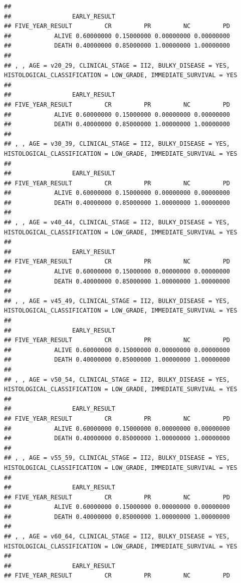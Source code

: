 \documentclass[]{article}
\begin{document}
\begin{verbatim}
## 
##                 EARLY_RESULT
## FIVE_YEAR_RESULT         CR         PR         NC         PD
##            ALIVE 0.60000000 0.15000000 0.00000000 0.00000000
##            DEATH 0.40000000 0.85000000 1.00000000 1.00000000
## 
## , , AGE = v20_29, CLINICAL_STAGE = II2, BULKY_DISEASE = YES, HISTOLOGICAL_CLASSIFICATION = LOW_GRADE, IMMEDIATE_SURVIVAL = YES
## 
##                 EARLY_RESULT
## FIVE_YEAR_RESULT         CR         PR         NC         PD
##            ALIVE 0.60000000 0.15000000 0.00000000 0.00000000
##            DEATH 0.40000000 0.85000000 1.00000000 1.00000000
## 
## , , AGE = v30_39, CLINICAL_STAGE = II2, BULKY_DISEASE = YES, HISTOLOGICAL_CLASSIFICATION = LOW_GRADE, IMMEDIATE_SURVIVAL = YES
## 
##                 EARLY_RESULT
## FIVE_YEAR_RESULT         CR         PR         NC         PD
##            ALIVE 0.60000000 0.15000000 0.00000000 0.00000000
##            DEATH 0.40000000 0.85000000 1.00000000 1.00000000
## 
## , , AGE = v40_44, CLINICAL_STAGE = II2, BULKY_DISEASE = YES, HISTOLOGICAL_CLASSIFICATION = LOW_GRADE, IMMEDIATE_SURVIVAL = YES
## 
##                 EARLY_RESULT
## FIVE_YEAR_RESULT         CR         PR         NC         PD
##            ALIVE 0.60000000 0.15000000 0.00000000 0.00000000
##            DEATH 0.40000000 0.85000000 1.00000000 1.00000000
## 
## , , AGE = v45_49, CLINICAL_STAGE = II2, BULKY_DISEASE = YES, HISTOLOGICAL_CLASSIFICATION = LOW_GRADE, IMMEDIATE_SURVIVAL = YES
## 
##                 EARLY_RESULT
## FIVE_YEAR_RESULT         CR         PR         NC         PD
##            ALIVE 0.60000000 0.15000000 0.00000000 0.00000000
##            DEATH 0.40000000 0.85000000 1.00000000 1.00000000
## 
## , , AGE = v50_54, CLINICAL_STAGE = II2, BULKY_DISEASE = YES, HISTOLOGICAL_CLASSIFICATION = LOW_GRADE, IMMEDIATE_SURVIVAL = YES
## 
##                 EARLY_RESULT
## FIVE_YEAR_RESULT         CR         PR         NC         PD
##            ALIVE 0.60000000 0.15000000 0.00000000 0.00000000
##            DEATH 0.40000000 0.85000000 1.00000000 1.00000000
## 
## , , AGE = v55_59, CLINICAL_STAGE = II2, BULKY_DISEASE = YES, HISTOLOGICAL_CLASSIFICATION = LOW_GRADE, IMMEDIATE_SURVIVAL = YES
## 
##                 EARLY_RESULT
## FIVE_YEAR_RESULT         CR         PR         NC         PD
##            ALIVE 0.60000000 0.15000000 0.00000000 0.00000000
##            DEATH 0.40000000 0.85000000 1.00000000 1.00000000
## 
## , , AGE = v60_64, CLINICAL_STAGE = II2, BULKY_DISEASE = YES, HISTOLOGICAL_CLASSIFICATION = LOW_GRADE, IMMEDIATE_SURVIVAL = YES
## 
##                 EARLY_RESULT
## FIVE_YEAR_RESULT         CR         PR         NC         PD

\end{verbatim}
\end{document}
